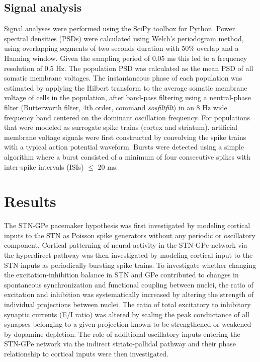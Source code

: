 \subsection{Signal analysis}
%

Signal analyses were performed using the SciPy toolbox \cite{jones_scipy_2001} for Python. Power spectral densities (PSDs) were calculated using Welch's periodogram method, using overlapping segments of two seconds duration with 50\% overlap and a Hanning window. Given the sampling period of 0.05 ms this led to a frequency resolution of 0.5 Hz. The population PSD was calculated as the mean PSD of all somatic membrane voltages. The instantaneous phase of each population was estimated by applying the Hilbert transform to the average somatic membrane voltage of cells in the population, after band-pass filtering using a neutral-phase filter (Butterworth filter, 4th order, command \textit{sosfiltfilt}) in an 8 Hz wide frequency band centered on the dominant oscillation frequency. For populations that were modeled as surrogate spike trains (cortex and striatum), artificial membrane voltage signals were first constructed by convolving the spike trains with a typical action potential waveform. Bursts were detected using a simple algorithm where a burst consisted of a minimum of four consecutive spikes with inter-spike intervals (ISIs) $\leq$ 20 ms.


%
%
%
\section{Results}
\label{sec:ch3-results}

%
%
%
%
%

The STN-GPe pacemaker hypothesis was first investigated by modeling cortical inputs to the STN as Poisson spike generators without any periodic or oscillatory component. Cortical patterning of neural activity in the STN-GPe network via the hyperdirect pathway was then investigated by modeling cortical input to the STN inputs as periodically bursting spike trains. To investigate whether changing the excitation-inhibition balance in STN and GPe contributed to changes in spontaneous synchronization and functional coupling between nuclei, the ratio of excitation and inhibition was systematically increased by altering the strength of individual projections between nuclei. The ratio of total excitatory to inhibitory synaptic currents (E/I ratio) was altered by scaling the peak conductance of all synapses belonging to a given projection known to be strengthened or weakened by dopamine depletion. The role of additional oscillatory inputs entering the STN-GPe network via the indirect striato-pallidal pathway and their phase relationship to cortical inputs were then investigated.
%
%
%
%
%

